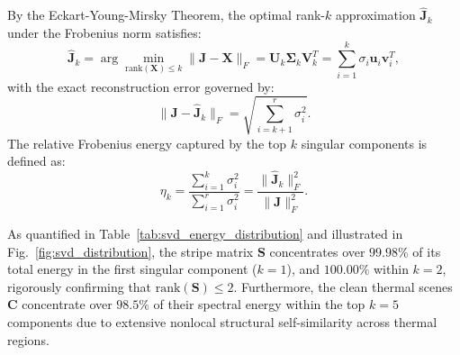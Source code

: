 By the Eckart-Young-Mirsky Theorem, the optimal rank-$k$ approximation $\widehat{\mathbf{J}}_k$ under the Frobenius norm satisfies:
\begin{equation}
\label{eq:eckart_young}
\widehat{\mathbf{J}}_k = \arg\min_{\mathrm{rank}(\mathbf{X}) \le k} \|\mathbf{J} - \mathbf{X}\|_F = \mathbf{U}_k \mathbf{\Sigma}_k \mathbf{V}_k^T = \sum_{i=1}^k \sigma_i \mathbf{u}_i \mathbf{v}_i^T,
\end{equation}
with the exact reconstruction error governed by:
\begin{equation}
\label{eq:svd_error}
\|\mathbf{J} - \widehat{\mathbf{J}}_k\|_F = \sqrt{\sum_{i=k+1}^r \sigma_i^2}.
\end{equation}
The relative Frobenius energy captured by the top $k$ singular components is defined as:
\begin{equation}
\label{eq:energy_ratio}
\eta_k = \frac{\sum_{i=1}^k \sigma_i^2}{\sum_{i=1}^r \sigma_i^2} = \frac{\|\widehat{\mathbf{J}}_k\|_F^2}{\|\mathbf{J}\|_F^2}.
\end{equation}

As quantified in Table~\ref{tab:svd_energy_distribution} and illustrated in Fig.~\ref{fig:svd_distribution}, the stripe matrix $\mathbf{S}$ concentrates over $99.98\%$ of its total energy in the first singular component ($k=1$), and $100.00\%$ within $k=2$, rigorously confirming that $\mathrm{rank}(\mathbf{S}) \le 2$. Furthermore, the clean thermal scenes $\mathbf{C}$ concentrate over $98.5\%$ of their spectral energy within the top $k=5$ components due to extensive nonlocal structural self-similarity across thermal regions.

